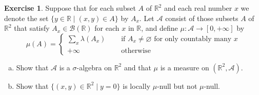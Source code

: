 \documentclass[11pt,a4paper,twoside]{article}
\theoremstyle{definition}
\newcounter{excounter}
\newtheorem{exercise}[excounter]{Exercise}
\begin{document}
\begin{exercise}

  Suppose that for each subset $A$ of $\mathbb{R}^2$ and each real number $x$ we denote the set
  $\{ y \in \mathbb{R} \mid (x, y) \in A \}$ by $A_x$. Let $\mathscr{A}$ consist of those subsets $A$
  of $\mathbb{R}^2$ that satisfy $A_x \in \mathscr{B} (\mathbb{R})$ for each $x$ in $\mathbb{R}$, and define
  $\mu : \mathscr{A} \to [0, {+\infty}]$ by
  \begin{equation*}
    \mu (A) = \begin{cases}
      \sum_x \lambda ( A_x ) &\quad\text{ if } A_x \neq \varnothing \text{ for only countably many } x \\
      +\infty &\quad\text{ otherwise }
    \end{cases}
  \end{equation*}
  \begin{enumerate}[(a)]
  \item Show that $\mathscr{A}$ is a $\sigma$-algebra on $\mathbb{R}^2$ and that $\mu$ is a measure on $(\mathbb{R}^2, \mathscr{A})$.
  \item Show that $\{ (x, y) \in \mathbb{R}^2 \mid y = 0 \}$ is locally $\mu$-null but not $\mu$-null.
  \end{enumerate}

\end{exercise}
\end{document}
